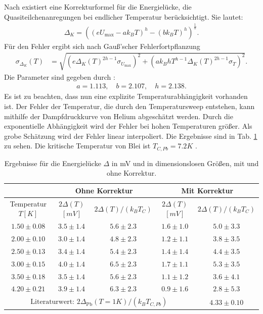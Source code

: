 \documentclass[twoside,        %
               BCOR12mm,       %
               english,ngerman, %
               fleqn,headsepline=false,footsepline=false
              ]{Vorlage/MFPREPORT}
\begin{document}
Nach \cite{pike1971} existiert eine Korrekturformel für die Energielücke, die
Quasiteilchenanregungen bei endlicher Temperatur berücksichtigt. Sie lautet:
\begin{align}
    \label{eq:korrektur}
    \Delta_K=\left( \left( eU_{\text{max}}-ak_BT \right)^h-\left( bk_BT
    \right)^h \right)^{\frac{1}{h}}.
\end{align}
Für den Fehler ergibt sich nach Gauß'scher Fehlerfortpflanzung
\begin{align}
    \label{eq:fehlerkorrektur}
    \sigma_{\Delta_{K}}(T)&=\sqrt{(e
    \Delta_{K}(T)^{2h-1}\sigma_{U_{\text{max}}})^2+(ak_BhT^{h-1}
    \Delta_K(T)^{2h-1}\sigma_T)^2}.
\end{align}
Die Parameter sind gegeben durch \cite{pike1971}:
\begin{align}
    a=1.113,\quad b=2.107,\quad h=2.138.
\end{align}
Es ist zu beachten, dass nun eine explizite Temperaturabhängigkeit vorhanden
ist. Der Fehler der Temperatur, die durch den Temperatursweep entstehen, kann
mithilfe der Dampfdruckkurve von Helium abgeschätzt werden. Durch die
exponentielle Abhängigkeit wird der Fehler bei hohen Temperaturen größer. Als
grobe Schätzung wird der Fehler linear interpoliert. Die Ergebnisse sind
in Tab. \ref{tab:res1} zu sehen.
Die kritische Temperatur von Blei ist $T_{C,Pb}=7.2K$ \cite{fprakt}.

\begin{table}[]
    \centering
    \begin{tabular}{|c|c|c|c|c|}
        \hline
        &\multicolumn{2}{|c|}{Ohne Korrektur}&\multicolumn{2}{|c|}{Mit
        Korrektur}\\\hline
        Temperatur $T [K]$&$2\Delta(T)$
        $[mV]$&$2\Delta(T)/(k_BT_C)$&$2\Delta(T)$
        $[mV]$&$2\Delta(T)/(k_BT_C)$\\\hline
        $1.50\pm0.08$&$3.5\pm1.4$&$5.6\pm2.3$&$1.6\pm1.0$&$5.0\pm3.3$\\\hline
        $2.00\pm0.10$&$3.0\pm1.4$&$4.8\pm2.3$&$1.2\pm1.1$&$3.8\pm3.5$\\\hline
        $2.50\pm0.13$&$3.4\pm1.4$&$5.4\pm2.3$&$1.4\pm1.4$&$4.4\pm3.5$\\\hline
        $3.00\pm0.15$&$4.0\pm1.4$&$6.5\pm2.3$&$1.7\pm1.1$&$5.3\pm3.5$\\\hline
        $3.50\pm0.18$&$3.5\pm1.4$&$5.6\pm2.3$&$1.1\pm1.2$&$3.6\pm4.1$\\\hline
        $4.20\pm0.21$&$3.9\pm1.4$&$6.3\pm2.3$&$0.9\pm1.6$&$2.8\pm5.3$\\\hline\hline
        \multicolumn{4}{|c|}{$\text{Literaturwert: }
        2\Delta_{\text{Pb}}(T=1K)/(k_BT_{C,Pb})$}&$4.33\pm0.10$
        \cite{giaever1961study}\\\hline

    \end{tabular}
    \caption{Ergebnisse für die Energielücke $\Delta$ in mV und in
    dimensionslosen Größen, mit und ohne Korrektur.}
    \label{tab:res1}
\end{table}
\end{document}
